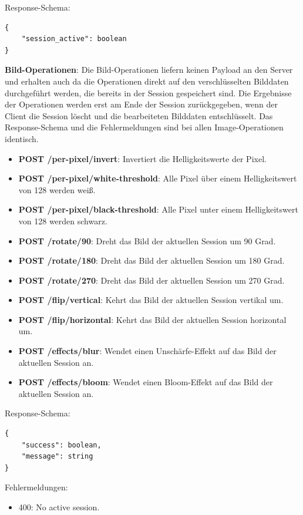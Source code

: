 Response-Schema:
\begin{lstlisting}
{
    "session_active": boolean
}
\end{lstlisting}

\textbf{Bild-Operationen}: 
Die Bild-Operationen liefern keinen Payload an den Server und erhalten auch da die Operationen direkt auf den verschlüsselten Bilddaten durchgeführt werden, die bereits in der Session gespeichert sind. Die Ergebnisse der Operationen werden erst am Ende der Session zurückgegeben, wenn der Client die Session löscht und die bearbeiteten Bilddaten entschlüsselt. Das Response-Schema und die Fehlermeldungen sind bei allen Image-Operationen identisch.
\begin{itemize}
    \item \textbf{POST /per-pixel/invert}: Invertiert die Helligkeitswerte der Pixel.
    \item \textbf{POST /per-pixel/white-threshold}: Alle Pixel über einem Helligkeitswert von 128 werden weiß.
    \item \textbf{POST /per-pixel/black-threshold}: Alle Pixel unter einem Helligkeitswert von 128 werden schwarz.
    \item \textbf{POST /rotate/90}: Dreht das Bild der aktuellen Session um 90 Grad.
    \item \textbf{POST /rotate/180}: Dreht das Bild der aktuellen Session um 180 Grad.
    \item \textbf{POST /rotate/270}: Dreht das Bild der aktuellen Session um 270 Grad.
    \item \textbf{POST /flip/vertical}: Kehrt das Bild der aktuellen Session vertikal um.
    \item \textbf{POST /flip/horizontal}: Kehrt das Bild der aktuellen Session horizontal um.
    \item \textbf{POST /effects/blur}: Wendet einen Unschärfe-Effekt auf das Bild der aktuellen Session an.
    \item \textbf{POST /effects/bloom}: Wendet einen Bloom-Effekt auf das Bild der aktuellen Session an.
\end{itemize}

Response-Schema:
\begin{lstlisting}
{
    "success": boolean,
    "message": string
}
\end{lstlisting}

Fehlermeldungen:
\begin{itemize}
    \item 400: No active session.
\end{itemize}

